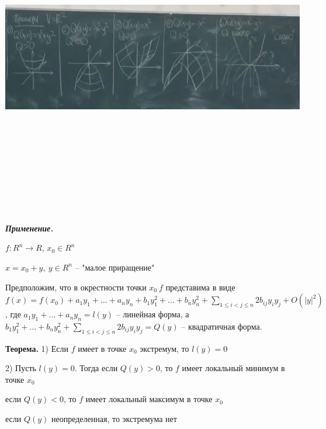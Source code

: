 \bigskip
\includegraphics[width=18cm,height=14cm,keepaspectratio]{examples.jpg}

\bigskip
\textbf{\textit{Применение.}}

$f : R^n \rightarrow R$, $x_0 \in R^n$

$x = x_0 + y, \ y \in R^n$ -- "малое приращение"

Предположим, что в окрестности точки $x_0 \ f$ представима в виде $f(x) = f(x_0) + a_1 y_1 + \dots + a_n y_n + b_1 y_1^2 + \dots + b_n y_n^2 + \sum\limits_{1 \leq i < j \leq n} 2 b_{ij} y_i y_j + O(|y|^2)$, где $a_1 y_1 + \dots + a_n y_n = l(y)$ -- линейная форма, а $b_1 y_1^2 + \dots + b_n y_n^2 + \sum\limits_{1 \leq i < j \leq n} 2 b_{ij} y_i y_j = Q(y)$ -- квадратичная форма.

\bigskip
\textbf{Теорема.} 1) Если $f$ имеет в точке $x_0$ экстремум, то $l(y) = 0$

2) Пусть $l(y) = 0$. Тогда если $Q(y) > 0$, то $f$ имеет локальный минимум в точке $x_0$

если $Q(y) < 0$, то $f$ имеет локальный максимум в точке $x_0$

если $Q(y)$ неопределенная, то экстремума нет

